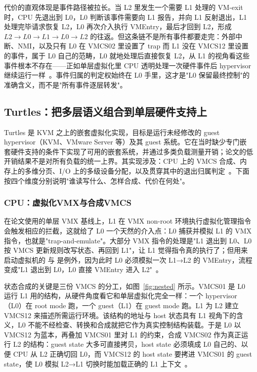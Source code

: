 代价的直观体现是事件路径被拉长。当 L2 里发生一个需要 L1 处理的 VM-exit 时，CPU 先退出到 L0，L0 判断该事件需要向 L1 报告，并向 L1 反射退出，L1 处理完毕请求恢复 L2，L0 再次介入执行 VMEntry，最后才回到 L2，形成 $L2 \to L0 \to L1 \to L0 \to L2$ 的往返。但这条链不是所有事件都要走完：外部中断、NMI，以及只有 L0 在 VMCS02 里设置了 trap 而 L1 没在 VMCS12 里设置的事件，属于 L0 自己的范畴，L0 就地处理后直接恢复 L2，从 L1 的视角看这些事件根本不存在——正如单层虚拟化里 CPU 透明处理一次硬件事件后 hypervisor 继续运行一样~\cite{source7}。事件归属的判定权始终在 L0 手里，这才是"L0 保留最终控制"的准确含义，而不是"所有事件逐层转发"。

\subsection{Turtles：把多层语义组合到单层硬件支持上}\label{sec:turtles}

Turtles 是 KVM 之上的嵌套虚拟化实现，目标是运行未经修改的 guest hypervisor（KVM、VMware Server 等）及其 guest 系统。它在当时缺少专门嵌套硬件支持的条件下实现了可用的嵌套系统，并通过多类负载测量开销；论文的低开销结果不是对所有负载的统一上界。其实现涉及：CPU 上的 VMCS 合成、内存上的多维分页、I/O 上的多级设备分配，以及贯穿其中的退出归属判定~\cite{source7}。下面按四个维度分别说明"谁读写什么、怎样合成、代价在何处"。

\subsubsection{CPU：虚拟化VMX与合成VMCS}\label{sec:nested-cpu}

在论文使用的单层 VMX 基线上，L1 在 VMX non-root 环境执行虚拟化管理指令会触发相应的拦截，这就给了 L0 一个天然的介入点：L0 捕获并模拟 L1 的 VMX 指令，也就是"trap-and-emulate"。大部分 VMX 指令的处理是"L1 退出到 L0、L0 按 VMCS 更新规则改写状态、再回到 L1"，让 L1 觉得指令真的执行了；但用来启动虚拟机的  与  是例外，因为此时 L0 必须模拟一次 L1→L2 的 VMEntry，流程变成"L1 退出到 L0，L0 直接 VMEntry 进入 L2"~\cite{source7}。

状态合成的关键是三份 VMCS 的分工，如图~\ref{fig:nested} 所示。VMCS01 是 L0 运行 L1 用的结构，从硬件角度看它和单层虚拟化完全一样：一个 hypervisor（L0）在 root mode 跑，一个 guest（L1）在 guest mode 跑。L1 为 L2 建立 VMCS12 来描述所需运行环境。该结构的地址与 host 状态具有 L1 视角下的含义，L0 不能不经检查、转换和合成就把它作为真实控制结构装载。于是 L0 以 VMCS12 为蓝本，再叠加 VMCS01 里对 L1 的约束，合成 VMCS02 作为真正运行 L2 的结构：guest state 大多可直接拷贝，host state 必须填成 L0 自己的、以便 CPU 从 L2 正确切回 L0，而 VMCS12 的 host state 要拷进 VMCS01 的 guest state，使 L0 模拟 L2→L1 切换时能加载正确的 L1 上下文~\cite{source7}。

